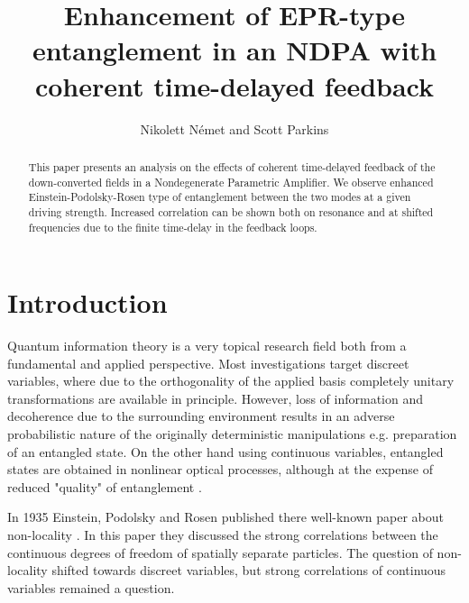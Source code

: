 \documentclass[final,review,3p,times,12pt]{elsarticle}
\begin{document}
\begin{frontmatter}

\title{Enhancement of EPR-type entanglement in an NDPA with coherent time-delayed feedback}

\author{Nikolett N\'emet and Scott Parkins}

\address{The Dodd-Walls Centre for Photonic and Quantum Technologies,\\
Department of Physics, University of Auckland, New Zealand}
\begin{abstract}
This paper presents an analysis on the effects of coherent time-delayed feedback of the down-converted fields in a Nondegenerate Parametric Amplifier. We observe enhanced Einstein-Podolsky-Rosen type of entanglement between the two modes at a given driving strength. Increased correlation can be shown both on resonance and at shifted frequencies due to the finite time-delay in the feedback loops.
\end{abstract}
\end{frontmatter}

\section{Introduction}
Quantum information theory is a very topical research field both from a fundamental and applied perspective. Most investigations target discreet variables, where due to the orthogonality of the applied basis completely unitary transformations are available in principle. However, loss of information and decoherence due to the surrounding environment results in an adverse probabilistic nature of the originally deterministic manipulations e.g. preparation of an entangled state. On the other hand using continuous variables, entangled states are obtained in nonlinear optical processes, although at the expense of reduced "quality" of entanglement \cite{Braunstein2005}.

In 1935 Einstein, Podolsky and Rosen published there well-known paper about non-locality \cite{Einstein1935}. In this paper they discussed the strong correlations between the continuous degrees of freedom of spatially separate particles. The question of non-locality shifted towards discreet variables, but strong correlations of continuous variables remained a question. 
\end{document}
